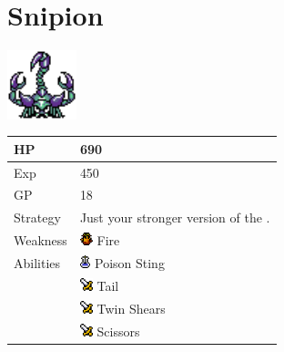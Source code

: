 \section{Snipion}
\label{monster:snipion}

\includegraphics[height=2cm,keepaspectratio]{./resources/monster/snipion}

\begin{longtable}{ l p{9cm} }
	HP
	& 690
\\ \hline
	Exp
	& 450
\\ \hline
	GP
	& 18
\\ \hline
	Strategy
	& Just your stronger version of the \nameref{monster:scorpion}.
\\ \hline
	Weakness
	& \includegraphics[height=1em,keepaspectratio]{./resources/effects/fire} Fire
\\ \hline
	Abilities
	& \includegraphics[height=1em,keepaspectratio]{./resources/effects/poison} Poison Sting \\
	& \includegraphics[height=1em,keepaspectratio]{./resources/effects/damage} Tail \\
	& \includegraphics[height=1em,keepaspectratio]{./resources/effects/damage} Twin Shears \\
	& \includegraphics[height=1em,keepaspectratio]{./resources/effects/damage} Scissors
\end{longtable}
